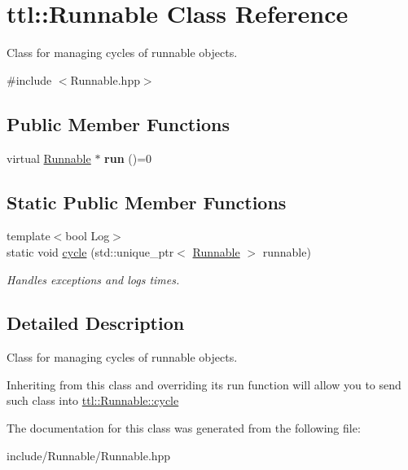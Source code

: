 \hypertarget{classttl_1_1_runnable}{\section{ttl\-:\-:Runnable Class Reference}
\label{classttl_1_1_runnable}
}


Class for managing cycles of runnable objects.  




{\ttfamily \#include $<$Runnable.\-hpp$>$}

\subsection*{Public Member Functions}
\begin{DoxyCompactItemize}
\item 
\hypertarget{classttl_1_1_runnable_af6956d428e33c97a44fe01e707f20c49}{virtual \hyperlink{classttl_1_1_runnable}{Runnable} $\ast$ {\bfseries run} ()=0}\label{classttl_1_1_runnable_af6956d428e33c97a44fe01e707f20c49}

\end{DoxyCompactItemize}
\subsection*{Static Public Member Functions}
\begin{DoxyCompactItemize}
\item 
\hypertarget{classttl_1_1_runnable_a8d25df1b461bae51dd4494f220e68d72}{{\footnotesize template$<$bool Log$>$ }\\static void \hyperlink{classttl_1_1_runnable_a8d25df1b461bae51dd4494f220e68d72}{cycle} (std\-::unique\-\_\-ptr$<$ \hyperlink{classttl_1_1_runnable}{Runnable} $>$ runnable)}\label{classttl_1_1_runnable_a8d25df1b461bae51dd4494f220e68d72}

\begin{DoxyCompactList}\small\item\em Handles exceptions and logs times. \end{DoxyCompactList}\end{DoxyCompactItemize}


\subsection{Detailed Description}
Class for managing cycles of runnable objects. 

Inheriting from this class and overriding its run function will allow you to send such class into \hyperlink{classttl_1_1_runnable_a8d25df1b461bae51dd4494f220e68d72}{ttl\-::\-Runnable\-::cycle} 

The documentation for this class was generated from the following file\-:\begin{DoxyCompactItemize}
\item 
include/\-Runnable/Runnable.\-hpp\end{DoxyCompactItemize}
